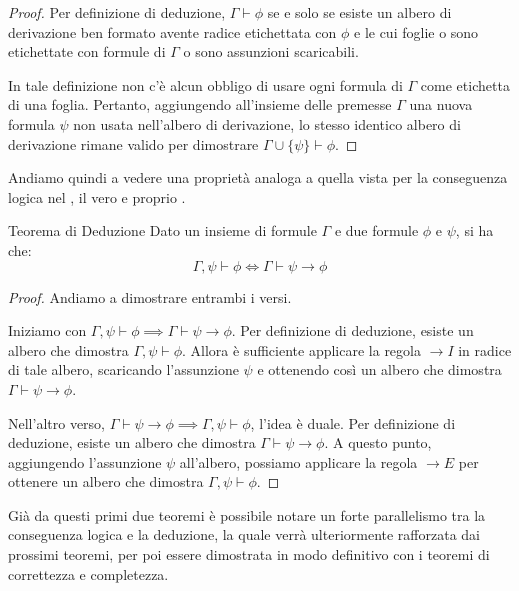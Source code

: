 \begin{proof}
  Per definizione di deduzione, \(\Gamma \vdash \phi\) se e solo se esiste un albero di derivazione ben formato avente radice etichettata con \(\phi\) e le cui foglie o sono etichettate con formule di \(\Gamma\) o sono assunzioni scaricabili. 

  In tale definizione non c'è alcun obbligo di usare ogni formula di \(\Gamma\) come etichetta di una foglia. Pertanto, aggiungendo all'insieme delle premesse \(\Gamma\) una nuova formula \(\psi\) non usata nell'albero di derivazione, lo stesso identico albero di derivazione rimane valido per dimostrare \(\Gamma \cup \{\psi\} \vdash \phi\).
\end{proof}

Andiamo quindi a vedere una proprietà analoga a quella vista per la conseguenza logica nel , il vero e proprio .

\begin{theorem}[namedlabel={thm:deduction}{Teorema di Deduzione}]{Teorema di Deduzione}
  Dato un insieme di formule \(\Gamma\) e due formule \(\phi\) e \(\psi\), si ha che:
  \[\Gamma, \psi \vdash \phi \iff \Gamma \vdash \psi \to \phi\]
\end{theorem}

\begin{proof}
  Andiamo a dimostrare entrambi i versi.
  
  Iniziamo con \(\Gamma, \psi \vdash \phi \implies \Gamma \vdash \psi \to \phi\).
  Per definizione di deduzione, esiste un albero che dimostra \(\Gamma, \psi \vdash \phi\). Allora è sufficiente applicare la regola \(\to I\) in radice di tale albero, scaricando l'assunzione \(\psi\) e ottenendo così un albero che dimostra \(\Gamma \vdash \psi \to \phi\).

  Nell'altro verso, \(\Gamma \vdash \psi \to \phi \implies \Gamma, \psi \vdash \phi\), l'idea è duale.
  Per definizione di deduzione, esiste un albero che dimostra \(\Gamma \vdash \psi \to \phi\). A questo punto, aggiungendo l'assunzione \(\psi\) all'albero, possiamo applicare la regola \(\to E\) per ottenere un albero che dimostra \(\Gamma, \psi \vdash \phi\).
\end{proof}

Già da questi primi due teoremi è possibile notare un forte parallelismo tra la conseguenza logica e la deduzione, la quale verrà ulteriormente rafforzata dai prossimi teoremi, per poi essere dimostrata in modo definitivo con i teoremi di correttezza e completezza.


